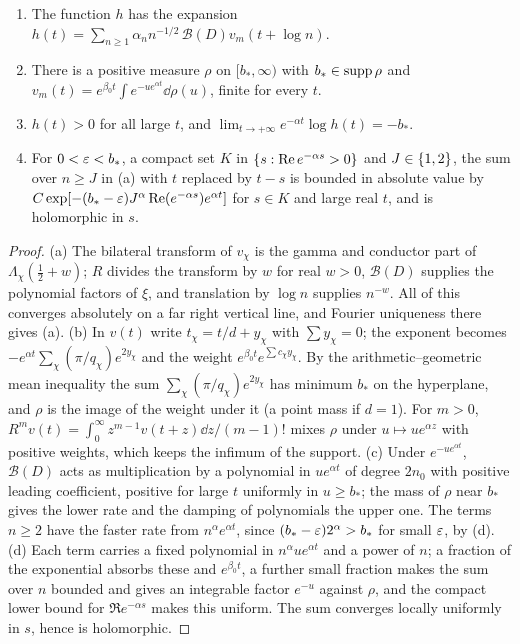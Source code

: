 \begin{lemma}\label{fil:lem:leading}
\begin{enumerate}[label=\textup{(\alph*)}]
\item The function $h$ has the expansion $h(t)=\sum_{n\ge1}\alpha_nn^{-1/2}\,\mathcal B(D)v_m(t+\log n)$.
\item There is a positive measure $\rho$ on $[b_*,\infty)$ with $b_*\in\operatorname{supp}\rho$ and
$v_m(t)=e^{\beta_0t}\int e^{-ue^{\alpha t}}\dd\rho(u)$, finite for every $t$.
\item $h(t)>0$ for all large $t$, and $\lim_{t\to+\infty}e^{-\alpha t}\log h(t)=-b_*$.
\item For $0<\varepsilon<b_*$, a compact set $K$ in $\{s:\operatorname{Re} e^{-\alpha s}>0\}$ and $J\in\{1,2\}$, the sum over $n\ge J$ in
\textup{(a)} with $t$ replaced by $t-s$ is bounded in absolute value by
$C\exp[-(b_*-\varepsilon)J^\alpha\operatorname{Re}(e^{-\alpha s})e^{\alpha t}]$ for $s\in K$ and large real $t$, and is holomorphic in $s$.
\end{enumerate}
\end{lemma}

\begin{proof}
(a) The bilateral transform of $v_\chi$ is the gamma and conductor part of $\Lambda_\chi(\tfrac12+w)$; $R$ divides
the transform by $w$ for real $w>0$, $\mathcal B(D)$ supplies the polynomial factors of $\xi$, and translation by
$\log n$ supplies $n^{-w}$. All of this converges absolutely on a far right vertical line, and Fourier uniqueness
there gives (a). (b) In $v(t)$ write $t_\chi=t/d+y_\chi$ with $\sum y_\chi=0$; the exponent becomes
$-e^{\alpha t}\sum_\chi(\pi/q_\chi)e^{2y_\chi}$ and the weight $e^{\beta_0t}e^{\sum c_\chi y_\chi}$. By the arithmetic--geometric
mean inequality the sum $\sum_\chi(\pi/q_\chi)e^{2y_\chi}$ has minimum $b_*$ on the hyperplane, and $\rho$ is the
image of the weight under it (a point mass if $d=1$). For $m>0$,
$R^mv(t)=\int_0^\infty z^{m-1}v(t+z)\dd z/(m-1)!$ mixes $\rho$ under $u\mapsto ue^{\alpha z}$ with positive weights, which keeps
the infimum of the support. (c) Under $e^{-ue^{\alpha t}}$, $\mathcal B(D)$ acts as multiplication by a polynomial in
$ue^{\alpha t}$ of degree $2n_0$ with positive leading coefficient, positive for large $t$ uniformly in $u\ge b_*$; the
mass of $\rho$ near $b_*$ gives the lower rate and the damping of polynomials the upper one. The terms $n\ge2$
have the faster rate from $n^\alpha e^{\alpha t}$, since $(b_*-\varepsilon)2^\alpha>b_*$ for small $\varepsilon$, by (d). (d) Each term
carries a fixed polynomial in $n^\alpha ue^{\alpha t}$ and a power of $n$; a fraction of the exponential absorbs these
and $e^{\beta_0t}$, a further small fraction makes the sum over $n$ bounded and gives an integrable factor $e^{-u}$
against $\rho$, and the compact lower bound for $\Re e^{-\alpha s}$ makes this uniform. The sum converges locally
uniformly in $s$, hence is holomorphic.
\end{proof}

